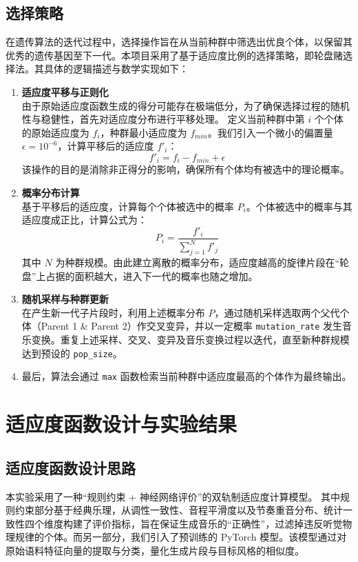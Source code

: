 \documentclass[12pt, a4paper]{ctexart}
\begin{document}
\subsection{选择策略}
在遗传算法的迭代过程中，选择操作旨在从当前种群中筛选出优良个体，以保留其优秀的遗传基因至下一代。本项目采用了基于适应度比例的选择策略，即轮盘赌选择法。其具体的逻辑描述与数学实现如下：
\begin{enumerate}
    \item \textbf{适应度平移与正则化} \mbox{} \\
由于原始适应度函数生成的得分可能存在极端低分，为了确保选择过程的随机性与稳健性，首先对适应度分布进行平移处理。
定义当前种群中第 $i$ 个个体的原始适应度为 $f_i$，种群最小适应度为 $f_{min}$。我们引入一个微小的偏置量 $\epsilon = 10^{-6}$，计算平移后的适应度 $f'_i$：
    \begin{equation}
        f'_i = f_i - f_{min} + \epsilon \label{eq:adapt}
    \end{equation}
该操作的目的是消除非正得分的影响，确保所有个体均有被选中的理论概率。

    \item \textbf{概率分布计算} \mbox{} \\
基于平移后的适应度，计算每个个体被选中的概率 $P_i$。个体被选中的概率与其适应度成正比，计算公式为：
    \begin{equation}
        P_i = \frac{f'_i}{\sum_{j=1}^{N} f'_j} \label{eq:prob}
    \end{equation}
其中 $N$ 为种群规模。由此建立离散的概率分布，适应度越高的旋律片段在“轮盘”上占据的面积越大，进入下一代的概率也随之增加。

    \item \textbf{随机采样与种群更新} \mbox{} \\
在产生新一代子片段时，利用上述概率分布 $P$，通过随机采样选取两个父代个体（Parent 1 \& Parent 2）作交叉变异，并以一定概率 \verb|mutation_rate| 发生音乐变换。重复上述采样、交叉、变异及音乐变换过程以迭代，直至新种群规模达到预设的 \verb|pop_size|。

    \item 最后，算法会通过 \verb|max| 函数检索当前种群中适应度最高的个体作为最终输出。
\end{enumerate}

\section{适应度函数设计与实验结果}
\subsection{适应度函数设计思路}
本实验采用了一种“规则约束 + 神经网络评价”的双轨制适应度计算模型。
其中规则约束部分基于经典乐理，从调性一致性、音程平滑度以及节奏重音分布、统计一致性四个维度构建了评价指标，旨在保证生成音乐的“正确性”，过滤掉违反听觉物理规律的个体。而另一部分，我们引入了预训练的 PyTorch 模型。该模型通过对原始语料特征向量的提取与分类，量化生成片段与目标风格的相似度。
\end{document}
